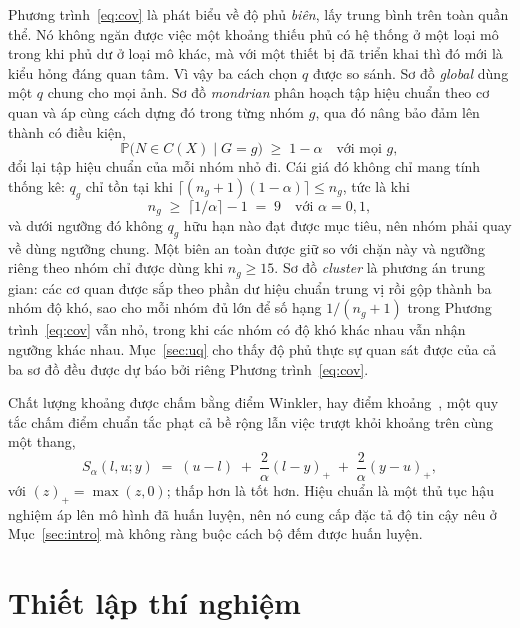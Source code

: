 \documentclass[preprint,12pt]{elsarticle}
\begin{document}
Phương trình~\eqref{eq:cov} là phát biểu về độ phủ \emph{biên}, lấy trung bình trên toàn quần thể. Nó không ngăn
được việc một khoảng thiếu phủ có hệ thống ở một loại mô trong khi phủ dư ở loại mô khác, mà với một thiết bị đã
triển khai thì đó mới là kiểu hỏng đáng quan tâm. Vì vậy ba cách chọn $q$ được so sánh. Sơ đồ \emph{global} dùng
một $q$ chung cho mọi ảnh. Sơ đồ \emph{mondrian} phân hoạch tập hiệu chuẩn theo cơ quan và áp cùng cách dựng đó
trong từng nhóm $g$, qua đó nâng bảo đảm lên thành có điều kiện,
\begin{equation}
\mathbb{P}\big(N \in C(X) \mid G = g\big) \;\ge\; 1-\alpha \quad \text{với mọi } g,
\end{equation}
đổi lại tập hiệu chuẩn của mỗi nhóm nhỏ đi. Cái giá đó không chỉ mang tính thống kê: $q_g$ chỉ tồn tại khi
$\lceil (n_g+1)(1-\alpha)\rceil \le n_g$, tức là khi
\begin{equation}\label{eq:feas}
n_g \;\ge\; \lceil 1/\alpha \rceil - 1 \;=\; 9 \quad \text{với } \alpha = 0{,}1,
\end{equation}
và dưới ngưỡng đó không $q_g$ hữu hạn nào đạt được mục tiêu, nên nhóm phải quay về dùng ngưỡng chung. Một biên an
toàn được giữ so với chặn này và ngưỡng riêng theo nhóm chỉ được dùng khi $n_g \ge 15$. Sơ đồ \emph{cluster} là
phương án trung gian: các cơ quan được sắp theo phần dư hiệu chuẩn trung vị rồi gộp thành ba nhóm độ khó, sao cho
mỗi nhóm đủ lớn để số hạng $1/(n_g+1)$ trong Phương trình~\eqref{eq:cov} vẫn nhỏ, trong khi các nhóm có độ khó
khác nhau vẫn nhận ngưỡng khác nhau. Mục~\ref{sec:uq} cho thấy độ phủ thực sự quan sát được của cả ba sơ đồ đều
được dự báo bởi riêng Phương trình~\eqref{eq:cov}.

Chất lượng khoảng được chấm bằng điểm Winkler, hay điểm khoảng~\cite{winkler}, một quy tắc chấm điểm chuẩn tắc
phạt cả bề rộng lẫn việc trượt khỏi khoảng trên cùng một thang,
\begin{equation}
S_\alpha(l,u;y) \;=\; (u-l) \;+\; \frac{2}{\alpha}(l-y)_{+} \;+\; \frac{2}{\alpha}(y-u)_{+},
\end{equation}
với $(z)_+ = \max(z,0)$; thấp hơn là tốt hơn. Hiệu chuẩn là một thủ tục hậu nghiệm áp lên mô hình đã huấn luyện,
nên nó cung cấp đặc tả độ tin cậy nêu ở Mục~\ref{sec:intro} mà không ràng buộc cách bộ đếm được huấn luyện.

\section{Thiết lập thí nghiệm}\label{sec:setup}
\end{document}
